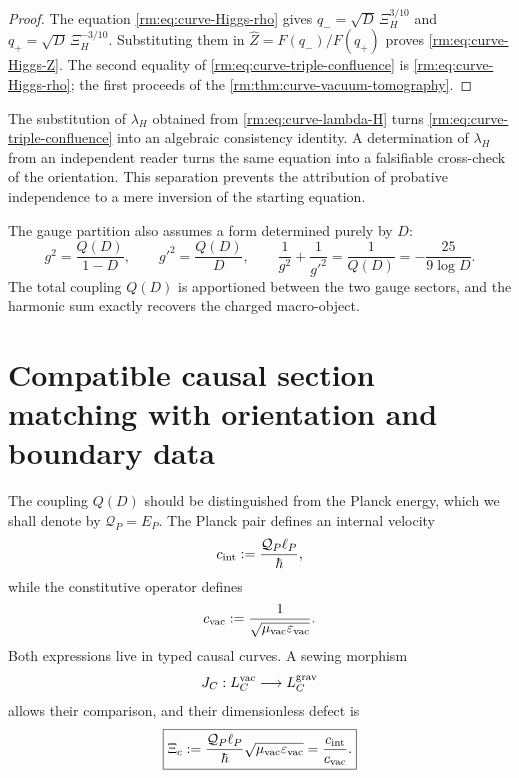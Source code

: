 \begin{proof}
The equation \cref{rm:eq:curve-Higgs-rho} gives
\(q_-=\sqrt D\,\Xi_H^{3/10}\) and
\(q_+=\sqrt D\,\Xi_H^{-3/10}\). Substituting them in
\(\widehat Z=F(q_-)/F(q_+)\) proves \cref{rm:eq:curve-Higgs-Z}. The second
equality of \cref{rm:eq:curve-triple-confluence} is
\cref{rm:eq:curve-Higgs-rho}; the first proceeds of the
\cref{rm:thm:curve-vacuum-tomography}.
\end{proof}

The substitution of \(\lambda_H\) obtained from
\cref{rm:eq:curve-lambda-H} turns
\cref{rm:eq:curve-triple-confluence} into an algebraic consistency identity.
A determination of \(\lambda_H\) from an independent reader turns
the same equation into a falsifiable cross-check of the orientation. This
separation prevents the attribution of probative independence to a mere inversion of
the starting equation.

The gauge partition also assumes a form determined purely
by \(D\):
\begin{equation}
 g^2=\frac{Q(D)}{1-D},
 \qquad
 g'^2=\frac{Q(D)}D,
 \qquad
 \boxed{
 \frac1{g^2}+\frac1{g'^2}=\frac1{Q(D)}
 =-\frac{25}{9\log D}.}
 \label{rm:eq:curve-gauge-harmonic}
\end{equation}
The total coupling \(Q(D)\) is apportioned between the two gauge sectors,
and the harmonic sum exactly recovers the charged macro-object.

\section{Compatible causal section matching with orientation and boundary data}

The coupling \(Q(D)\) should be distinguished from the Planck energy,
which we shall denote by \(\mathcal Q_P=E_P\). The Planck pair defines an
internal velocity
\begin{equation}
 c_{\rm int}:=\frac{\mathcal Q_P\ell_P}{\hbar},
 \label{rm:eq:curve-c-int}
\end{equation}
while the constitutive operator defines
\begin{equation}
 c_{\rm vac}:=\frac1{\sqrt{\mu_{\rm vac}\varepsilon_{\rm vac}}}.
 \label{rm:eq:curve-c-vac}
\end{equation}
Both expressions live in typed causal curves. A sewing morphism
\begin{equation}
 J_C:L_C^{\rm vac}\longrightarrow L_C^{\rm grav}
 \label{rm:eq:curve-JC}
\end{equation}
allows their comparison, and their dimensionless defect is
\begin{equation}
 \boxed{
 \Xi_c
 :=\frac{\mathcal Q_P\ell_P}{\hbar}
   \sqrt{\mu_{\rm vac}\varepsilon_{\rm vac}}
 =\frac{c_{\rm int}}{c_{\rm vac}}.}
 \label{rm:eq:curve-Xi-c}
\end{equation}

